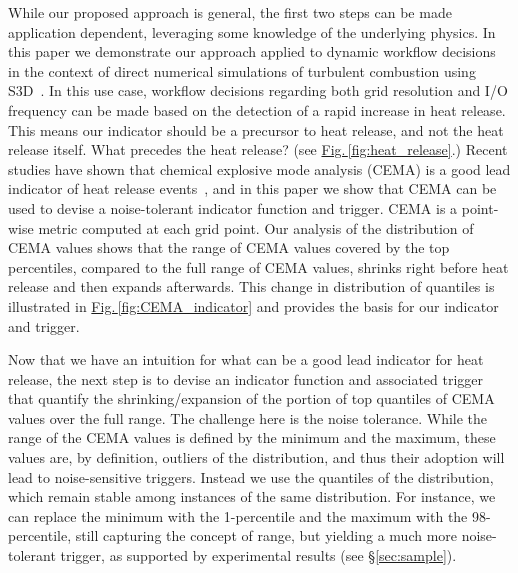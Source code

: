 \documentclass[final]{siamltex}
\newcommand{\Sec}[1]{\hyperref[sec:#1]{\S\ref*{sec:#1}}} \newcommand{\App}[1]{\hyperref[sec:#1]{Appendix~\ref*{sec:#1}}} \newcommand{\Eqn}[1]{\hyperref[eq:#1]{(\ref*{eq:#1})}} \newcommand{\Fig}[1]{\hyperref[fig:#1]{Fig.\,\ref*{fig:#1}}} \newcommand{\Tab}[1]{\hyperref[tab:#1]{Tab.\,\ref*{tab:#1}}} \newcommand{\Thm}[1]{\hyperref[thm:#1]{Thm.\,\ref*{thm:#1}}} \newcommand{\Lem}[1]{\hyperref[lem:#1]{Lem.\,\ref*{lem:#1}}} \newcommand{\Prop}[1]{\hyperref[prop:#1]{Prop.~\ref*{prop:#1}}} \newcommand{\Cor}[1]{\hyperref[cor:#1]{Cor.~\ref*{cor:#1}}} \newcommand{\Def}[1]{\hyperref[def:#1]{Defn.~\ref*{def:#1}}} \newcommand{\Ex}[1]{\hyperref[ex:#1]{Ex.~\ref*{ex:#1}}} \newcommand{\Clm}[1]{\hyperref[clm:#1]{Claim~\ref*{clm:#1}}} \newcommand{\Step}[1]{\hyperref[step:#1]{Step~\ref*{step:#1}}} \def\btodo{\color{red}}
\begin{document}
While our proposed approach is general, the first two steps can be made application
dependent, leveraging some knowledge of the underlying physics.  
In this paper we demonstrate our approach applied to dynamic workflow decisions 
in the context of direct numerical simulations of turbulent combustion using
S3D~\cite{chen09}.  In this use case, workflow decisions regarding both grid resolution 
and I/O frequency can be made based on the detection of a 
rapid increase in heat release.  This means our indicator should be a precursor to
heat release, and not the heat release itself.  What precedes the heat release?
 (see \Fig{heat_release}.) 
Recent studies have shown that chemical explosive mode analysis (CEMA) is a good lead indicator of 
heat release events~\cite{lu,shan}, and in this paper we show that CEMA can be used to 
devise a noise-tolerant indicator function and trigger.    CEMA is a point-wise
metric computed at each grid point.  Our analysis of the distribution of  CEMA
values  shows that the range of 
CEMA values covered by the top percentiles, compared to the full range of CEMA values, 
shrinks right before heat release and then expands  afterwards. This change in
distribution of quantiles is illustrated in \Fig{CEMA_indicator} and provides the
basis for our indicator and trigger. 

Now that we have an intuition for what can be a good lead indicator for heat release, 
the next step is to devise an indicator function and associated trigger that
quantify  the shrinking/expansion of the portion of top quantiles of CEMA values 
over the full range. The challenge here is the noise tolerance.  While the range of 
the CEMA values is defined  by the minimum and  the maximum, these  values are, by definition, 
outliers of the distribution,  and thus their adoption will lead to
noise-sensitive triggers.  Instead we use the quantiles of the distribution,  
which  remain stable among instances of the same distribution. For instance, we can 
replace the minimum with the 1-percentile and the maximum with the
98-percentile, still capturing the concept of range, but yielding a much more 
noise-tolerant trigger, as supported by experimental results (see \Sec{sample}). 
\end{document}
